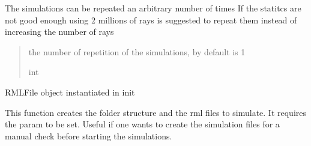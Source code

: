\documentclass[letterpaper,10pt,english]{sphinxmanual}
\begin{document}
\begin{fulllineitems}
\begin{fulllineitems}
\end{fulllineitems}


\begin{fulllineitems}
\label{\detokenize{code_documentation:raypyng.simulate.Simulate.repeat}}
\pysigstartsignatures
{}
\pysigstopsignatures
\sphinxAtStartPar
The simulations can be repeated an arbitrary number of times
If the statitcs are not good enough using 2 millions of rays is suggested
to repeat them instead of increasing the number of rays
\begin{quote}\begin{description}
\sphinxAtStartPar
the number of repetition of the simulations, by default is 1

\sphinxAtStartPar
int

\end{description}\end{quote}

\end{fulllineitems}


\begin{fulllineitems}
\label{\detokenize{code_documentation:raypyng.simulate.Simulate.rml}}
\pysigstartsignatures
{}
\pysigstopsignatures
\sphinxAtStartPar
RMLFile object instantiated in init

\end{fulllineitems}


\begin{fulllineitems}
\label{\detokenize{code_documentation:raypyng.simulate.Simulate.rml_list}}
\pysigstartsignatures
{}
\pysigstopsignatures
\sphinxAtStartPar
This function creates the folder structure and the rml files to simulate.
It requires the param to be set. Useful if one wants to create the simulation files
for a manual check before starting the simulations.


\end{fulllineitems}
\end{fulllineitems}
\end{document}
